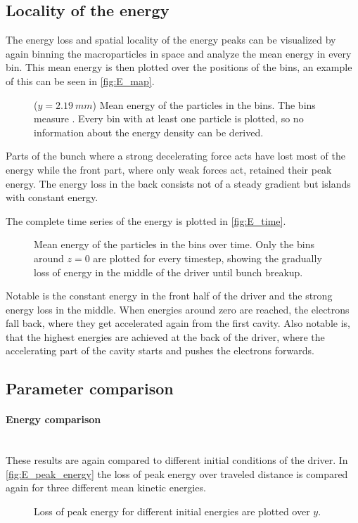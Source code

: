 \documentclass[bachelor_thesis]{subfiles}
\begin{document}
\subsection{Locality of the energy}\label{chap:loc_E}
The energy loss and spatial locality of the energy peaks can be visualized by again binning the macroparticles in space and analyze the mean energy in every bin. This mean energy is then plotted over the positions of the bins,
an example of this can be seen in \autoref{fig:E_map}. 
\begin{figure}
	\centering
	
	\caption{($y=\qty{2.19}{mm}$) Mean energy of the particles in the bins. The bins measure . Every bin with at least one particle is plotted, so no information about the energy density can be derived.}
	\label{fig:E_map}
\end{figure}

Parts of the bunch where a strong decelerating force acts have lost most of the energy while the front part, where only weak forces act, retained their peak energy. The energy loss in the back consists not of a steady gradient but islands with constant energy.

The complete time series of the energy is plotted in \autoref{fig:E_time}.
\begin{figure}
	\centering
	
	\caption{Mean energy of the particles in the bins over time. Only the bins around $z=0$ are plotted for every timestep, showing the gradually loss of energy in the middle of the driver until bunch breakup.}
	\label{fig:E_time}
\end{figure}
Notable is the constant energy in the front half of the driver and the strong energy loss in the middle. When energies around zero are reached, the electrons fall back, where they get accelerated again from the first cavity.
Also notable is, that the highest energies are achieved at the back of the driver, where the accelerating part of the cavity starts and pushes the electrons forwards.

\subsection{Parameter comparison}
\paragraph*{Energy comparison}\hspace{0pt} \\
These results are again compared to different initial conditions of the driver. In \autoref{fig:E_peak_energy} the loss of peak energy over traveled distance is compared again for three different mean kinetic energies.
\begin{figure}
	\centering
	
	\caption{Loss of peak energy for different initial energies are plotted over $y$.}
	\label{fig:E_peak_energy}
\end{figure}
\end{document}
